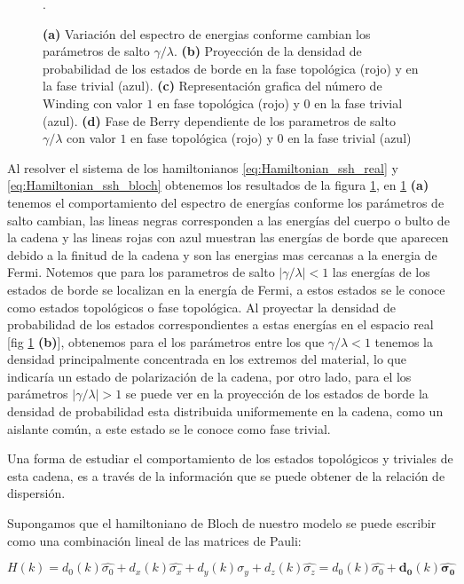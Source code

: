 \begin{figure}[tbh!]
\begin{subfigure}[b!]{0.25 \textwidth}
     \end{subfigure}
        \caption{\textbf{(a)} Variación del espectro de energias conforme cambian los parámetros de salto $\gamma/\lambda$. \textbf{(b)} Proyección de la densidad de probabilidad de los estados de borde en la fase topológica (rojo) y en la fase trivial (azul). \textbf{(c)} Representación grafica del número de Winding con valor $1$ en fase topológica (rojo) y $0$ en la fase trivial (azul). \textbf{(d)} Fase de Berry dependiente de los parametros de salto $\gamma/\lambda$ con valor $1$ en fase topológica (rojo) y $0$ en la fase trivial (azul)}.
        \label{fig:SSH_Img_Results}
\end{figure}

Al resolver el sistema de los hamiltonianos \eqref{eq:Hamiltonian_ssh_real} y \eqref{eq:Hamiltonian_ssh_bloch} obtenemos los resultados de la figura \ref{fig:SSH_Img_Results}, en \ref{fig:SSH_Img_Results} \textbf{(a)} tenemos el comportamiento del espectro de energías conforme los parámetros de salto cambian, las lineas negras corresponden a las energías del cuerpo o bulto de la cadena y las lineas rojas con azul muestran las energías de borde que aparecen debido a la finitud de la cadena y son las energias mas cercanas a la energia de Fermi. Notemos que para los parametros de salto $|\gamma/\lambda|<1$ las energías de los estados de borde se localizan en la energía de Fermi, a estos estados se le conoce como estados topológicos o fase topológica. Al proyectar la densidad de probabilidad de los estados correspondientes a estas energías en el espacio real [fig \ref{fig:SSH_Img_Results} \textbf{(b)}], obtenemos para el los parámetros entre los que $\gamma/\lambda < 1$ tenemos la densidad principalmente concentrada en los extremos del material, lo que indicaría un estado de polarización de la cadena, por otro lado, para el los parámetros $|\gamma/\lambda| > 1$ se puede ver en la proyección de los estados de borde la densidad de probabilidad esta distribuida uniformemente en la cadena, como un aislante común, a este estado se le conoce como fase trivial.

Una forma de estudiar el comportamiento de los estados topológicos y triviales de esta cadena, es a través de la información que se puede obtener de la relación de dispersión. 

Supongamos que el hamiltoniano de Bloch de nuestro modelo se puede escribir como una combinación lineal de las matrices de Pauli:

\begin{equation}
    H(k) = d_0(k) \hat{\sigma_0} + d_x(k) \hat{\sigma_x} + d_y(k) \hat{\sigma_y} + d_z(k) \hat{\sigma_z} = d_0(k) \hat{\sigma_0} + \mathbf{d_0}(k) \mathbf{\hat{\sigma_0}}
\end{equation}

